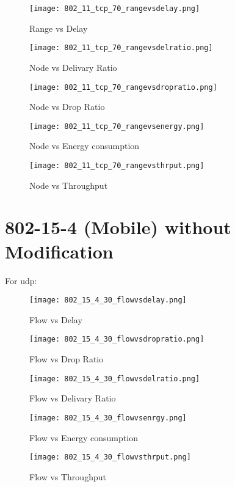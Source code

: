 \documentclass{report}
\begin{document}
\begin{figure}
  \caption{Range vs Delay}
  \centering
    \texttt{[image: 802\_11\_tcp\_70\_rangevsdelay.png]}
\end{figure}
\begin{figure}
  \caption{Node vs Delivary Ratio}
  \centering
    \texttt{[image: 802\_11\_tcp\_70\_rangevsdelratio.png]}
\end{figure}
\begin{figure}
  \caption{Node vs Drop Ratio}
  \centering
    \texttt{[image: 802\_11\_tcp\_70\_rangevsdropratio.png]}
\end{figure}
\begin{figure}
  \caption{Node vs Energy consumption}
  \centering
    \texttt{[image: 802\_11\_tcp\_70\_rangevsenergy.png]}
\end{figure}
\begin{figure}
  \caption{Node vs Throughput}
  \centering
    \texttt{[image: 802\_11\_tcp\_70\_rangevsthrput.png]}
\end{figure}

\chapter{802-15-4 (Mobile) without Modification}

For udp:
\begin{figure}
  \caption{Flow vs Delay}
  \centering
    \texttt{[image: 802\_15\_4\_30\_flowvsdelay.png]}
\end{figure}
\begin{figure}
  \caption{Flow vs Drop Ratio}
  \centering
    \texttt{[image: 802\_15\_4\_30\_flowvsdropratio.png]}
\end{figure}
\begin{figure}
  \caption{Flow vs Delivary Ratio}
  \centering
    \texttt{[image: 802\_15\_4\_30\_flowvsdelratio.png]}
\end{figure}
\begin{figure}
  \caption{Flow vs Energy consumption}
  \centering
    \texttt{[image: 802\_15\_4\_30\_flowvsenrgy.png]}
\end{figure}
\begin{figure}
  \caption{Flow vs Throughput}
  \centering
    \texttt{[image: 802\_15\_4\_30\_flowvsthrput.png]}
\end{figure}
\end{document}
